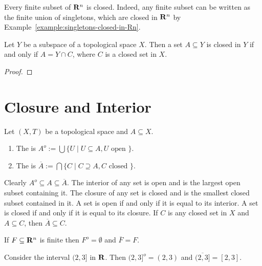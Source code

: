 \begin{example}
    Every finite subset of $\mathbf{R}^n$ is closed. Indeed, any finite subset can be written as the finite union of singletons, which are closed in $\mathbf{R}^n$ by Example~\ref{example:singletons-closed-in-Rn}.
\end{example}

\begin{proposition}
    Let $Y$ be a subspace of a topological space $X$. Then a set $A \subseteq Y$ is closed in $Y$ if and only if $A = Y \cap C$, where $C$ is a closed set in $X$.
\end{proposition}
    {\color{red} \begin{proof}
        
    \end{proof}}

\section{Closure and Interior}

\begin{definition}
    Let $(X,T)$ be a topological space and $A\subseteq X$.
    \begin{enumerate}[label = (\arabic*),itemsep=1pt,topsep=3pt]
        \item The  is $A^o := \bigcup \{U \mid U \subseteq A, U \text{ open }\}$.
        \item The  is $\overline{A} := \bigcap\{C \mid C \supseteq A, C \text{ closed }\}$.
    \end{enumerate}
\end{definition}

\begin{remark}
Clearly $A^o \subseteq A \subseteq \overline{A}$. The interior of any set is open and is the largest open subset containing it. The closure of any set is closed and is the smallest closed subset contained in it. A set is open if and only if it is equal to its interior. A set is closed if and only if it is equal to its closure. If $C$ is any closed set in $X$ and $A \subseteq C$, then $\overline{A} \subseteq C$.
\end{remark}

\begin{example}
    If $F \subseteq \mathbf{R}^n$ is finite then $F^o = \emptyset$ and $\overline{F} = F$.
\end{example}

\begin{example}
    Consider the interval $(2,3]$ in $\mathbf{R}$. Then $(2,3]^o = (2,3)$ and $\overline{(2,3]} = [2,3]$.
\end{example}

